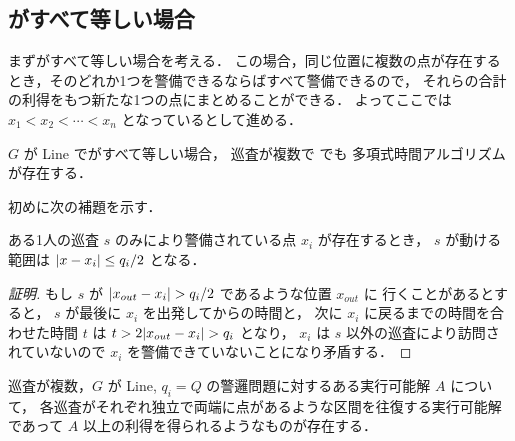 \subsection{{\timelimit}がすべて等しい場合}
まず{\timelimit}がすべて等しい場合を考える．
この場合，同じ位置に複数の点が存在するとき，そのどれか1つを警備できるならばすべて警備できるので，
それらの合計の利得をもつ新たな1つの点にまとめることができる．
よってここでは $x_1 < x_2 < \cdots < x_n$ となっているとして進める．


\begin{theo}
	\label{theo:1_Line_multiple_Q_polytime}
	$G$ が Line で{\timelimit}がすべて等しい場合，
	巡査が複数で \optpp でも
	多項式時間アルゴリズムが存在する．
\end{theo}


初めに次の補題を示す．

\begin{lemm}
	\label{lemm:MultiplePatrolOnLine_3}
	ある1人の巡査 $s$ のみにより警備されている点 $x_i$ が存在するとき，
	$s$ が動ける範囲は $|{ x - x_i }| \leq q_i / 2$ となる．
\end{lemm}

\begin{proof}[証明]
	もし $s$ が $|{ x_{out} - x_i }| > q_i /2$ であるような位置 $x_{out}$ に
	行くことがあるとすると，
	$s$ が最後に $x_i$ を出発してからの時間と，
	次に $x_i$ に戻るまでの時間を合わせた時間 $t$ は
	$t > 2 |{ x_{out} - x_i}| > q_i$
	となり，
	$x_i$ は $s$ 以外の巡査により訪問されていないので
	$x_i$ を警備できていないことになり矛盾する．
\end{proof}



\begin{lemm}
	\label{lemm:MultiplePatrolOnLine_2}
	巡査が複数，$G$ が Line, $q_i = Q$ の警邏問題に対するある実行可能解 $A$ について，
	各巡査がそれぞれ独立で両端に点があるような区間を往復する実行可能解であって
	$A$ 以上の利得を得られるようなものが存在する．
\end{lemm}

